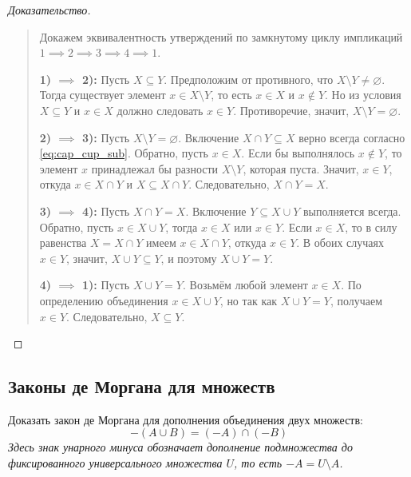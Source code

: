 \begin{proof}[Доказательство]~\\
    \begin{quote}
        Докажем эквивалентность утверждений по замкнутому циклу импликаций 
        $1 \implies 2 \implies 3 \implies 4 \implies 1$.

        \textbf{1) $\implies$ 2):} Пусть $X \subseteq Y$. Предположим от 
        противного, что $X \setminus Y \neq \varnothing$. Тогда существует 
        элемент $x \in X \setminus Y$, то есть $x \in X$ и $x \notin Y$. 
        Но из условия $X \subseteq Y$ и $x \in X$ должно следовать 
        $x \in Y$. Противоречие, значит, $X \setminus Y = \varnothing$.

        \textbf{2) $\implies$ 3):} Пусть $X \setminus Y = \varnothing$. 
        Включение $X \cap Y \subseteq X$ верно всегда согласно 
        \eqref{eq:cap_cup_sub}. Обратно, пусть $x \in X$. Если бы 
        выполнялось $x \notin Y$, то элемент $x$ принадлежал бы разности 
        $X \setminus Y$, которая пуста. Значит, $x \in Y$, откуда 
        $x \in X \cap Y$ и $X \subseteq X \cap Y$. Следовательно, 
        $X \cap Y = X$.

        \textbf{3) $\implies$ 4):} Пусть $X \cap Y = X$. Включение 
        $Y \subseteq X \cup Y$ выполняется всегда. Обратно, пусть 
        $x \in X \cup Y$, тогда $x \in X$ или $x \in Y$. Если $x \in X$, 
        то в силу равенства $X = X \cap Y$ имеем $x \in X \cap Y$, откуда 
        $x \in Y$. В обоих случаях $x \in Y$, значит, $X \cup Y \subseteq Y$, 
        и поэтому $X \cup Y = Y$.

        \textbf{4) $\implies$ 1):} Пусть $X \cup Y = Y$. Возьмём любой 
        элемент $x \in X$. По определению объединения $x \in X \cup Y$, но 
        так как $X \cup Y = Y$, получаем $x \in Y$. Следовательно, 
        $X \subseteq Y$.
    \end{quote}
\end{proof}

\subsection{Законы де Моргана для множеств}

\begin{problem}
    Доказать закон де Моргана для дополнения объединения двух множеств:
    \begin{equation} \label{eq:demorgan_cup}
        -(A \cup B) = (-A) \cap (-B) \tag{6}
    \end{equation}
    \emph{Здесь знак унарного минуса обозначает дополнение подмножества до 
    фиксированного универсального множества $U$, то есть $-A = U \setminus A$.}
\end{problem}

